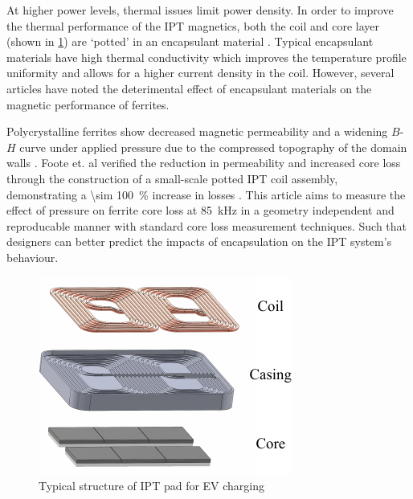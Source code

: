 \documentclass[conference]{IEEEtran}
\begin{document}
At higher power levels, thermal issues limit power density. 
In order to improve the thermal performance of the IPT magnetics, both the coil and core layer (shown in \cref{fig:padstructure}) are `potted' in an encapsulant material \cite{kneidlProcessingInfluencesResinbased2020}. 
Typical encapsulant materials have high thermal conductivity which improves the temperature profile uniformity and allows for a higher current density in the coil. 
However, several articles have noted the deterimental effect of encapsulant materials on the magnetic performance of ferrites. 

Polycrystalline ferrites show decreased magnetic permeability and a widening $B$-$H$ curve under applied pressure due to the compressed topography of the domain walls \cite{leflochEffectPressureSoft1981}. 
Foote et. al verified the reduction in permeability and increased core loss through the construction of a small-scale potted IPT coil assembly, demonstrating a \SI{\sim 100}{\percent} increase in losses \cite{footeEncapsulationResidualStress2023}.
This article aims to measure the effect of pressure on ferrite core loss at \SI{85}{\kilo\hertz} in a geometry independent and reproducable manner with standard core loss measurement techniques. Such that designers can better predict the impacts of encapsulation on the IPT system's behaviour. 

\begin{figure}[t]
  \centering
  \includegraphics{figures/padstructure.pdf}
  \caption{Typical structure of IPT pad for EV charging}
  \label{fig:padstructure}
\end{figure}
\end{document}
